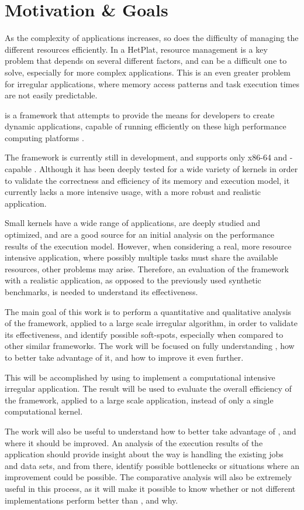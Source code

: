 \documentclass[main.tex]{subfiles}
\begin{document}
\section{Motivation \& Goals}


As the complexity of applications increases, so does the difficulty of managing the different resources efficiently. In a \ac{HetPlat}, resource management is a key problem that depends on several different factors, and can be a difficult one to solve, especially for more complex applications. This is an even greater problem for irregular applications, where memory access patterns and task execution times are not easily predictable.

\gama is a framework that attempts to provide the means for developers to create dynamic applications, capable of running efficiently on these high performance computing platforms \cite{joao2012gama}.

The \gama framework is currently still in development, and supports only x86-64 \cpus and \cuda-capable \gpus. Although it has been deeply tested for a wide variety of kernels in order to validate the correctness and efficiency of its memory and execution model, it currently lacks a more intensive usage, with a more robust and realistic application.

Small kernels have a wide range of applications, are deeply studied and optimized, and are a good source for an initial analysis on the performance results of the execution model. However, when considering a real, more resource intensive application, where possibly multiple tasks must share the available resources, other problems may arise. Therefore, an evaluation of the framework with a realistic application, as opposed to the previously used synthetic benchmarks, is needed to understand its effectiveness.

The main goal of this work is to perform a quantitative and qualitative analysis of the \gama framework, applied to a large scale irregular algorithm, in order to validate its effectiveness, and identify possible soft-spots, especially when compared to other similar frameworks. The work will be focused on fully understanding \gama, how to better take advantage of it, and how to improve it even further.

This will be accomplished by using \gama to implement a computational intensive irregular application. The result will be used to evaluate the overall efficiency of the \gama framework, applied to a large scale application, instead of only a single computational kernel.

The work will also be useful to understand how to better take advantage of \gama, and where it should be improved. An analysis of the execution results of the application should provide insight about the way \gama is handling the existing jobs and data sets, and from there, identify possible bottlenecks or situations where an improvement could be possible. The comparative analysis will also be extremely useful in this process, as it will make it possible to know whether or not different implementations perform better than \gama, and why.
\end{document}
